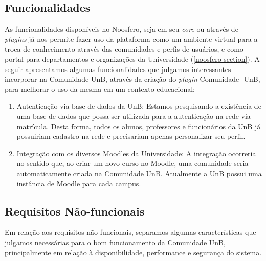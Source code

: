 \subsection{Funcionalidades}

As funcionalidades disponíveis no Noosfero, seja em seu \textit{core}
ou através de \textit{plugins} já nos permite fazer uso da plataforma como
um ambiente virtual para a troca de conhecimento através das comunidades e
perfis de usuários, e como portal para departamentos e organizações da
Universidade (\ref{noosfero-section}).
%
A seguir apresentamos algumas funcionalidades que julgamos interessantes
incorporar na Comunidade UnB, através da criação do \textit{plugin} Comunidade-
UnB, para melhorar o uso da mesma em um contexto educacional:

	\begin{enumerate}
		\item Autenticação via base de dados da UnB:
		Estamos pesquisando a existência de uma base de dados que possa
		ser utilizada para a autenticação na rede via matrícula. Desta forma,
		todos os alunos, professores e funcionários da UnB já possuiriam
		cadastro na rede e precisariam apenas personalizar seu perfil.
		\item Integração com os diversos Moodles da Universidade:
		A integração ocorreria no sentido que, ao criar um novo curso no
		Moodle, uma comunidade seria automaticamente criada na Comunidade
		UnB. Atualmente a UnB possui uma instância de Moodle para cada
		campus.
	\end{enumerate}

\subsection{Requisitos Não-funcionais}

Em relação aos requisitos não funcionais, separamos algumas características que
julgamos necessárias para o bom funcionamento da Comunidade UnB, principalmente
em relação à disponibilidade, performance e segurança do sistema.

